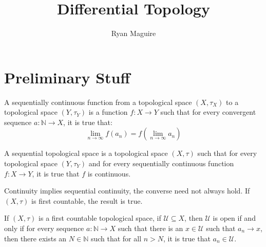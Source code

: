 \documentclass{article}                                                        %
\begin{document}
    \title{Differential Topology}
    \author{Ryan Maguire}
    \date{\vspace{-5ex}}
    \maketitle
    \section{Preliminary Stuff}
        \begin{definition}
            A sequentially continuous function from a topological space
            $(X,\tau_{X})$ to a topological space $(Y,\tau_{Y})$ is a
            function $f:X\rightarrow{Y}$ such that for every convergent sequence
            $a:\mathbb{N}\rightarrow{X}$, it is true that:
            \begin{equation*}
                \lim_{n\rightarrow\infty}f(a_{n})
                =f(\lim_{n\rightarrow\infty}a_{n})
            \end{equation*}
        \end{definition}
        \begin{definition}
            A sequential topological space is a topological space $(X,\tau)$
            such that for every topological space $(Y,\tau_{Y})$ and for every
            sequentially continuous function $f:X\rightarrow{Y}$, it is true
            that $f$ is continuous.
        \end{definition}
        Continuity implies sequential continuity, the converse need not always
        hold. If $(X,\tau)$ is first countable, the result is true.
        \begin{theorem}
            If $(X,\tau)$ is a first countable topological space, if
            $\mathcal{U}\subseteq{X}$, then $\mathcal{U}$ is open if and only if
            for every sequence $a:\mathbb{N}\rightarrow{X}$ such that there is
            an $x\in\mathcal{U}$ such that $a_{n}\rightarrow{x}$, then there
            exists an $N\in\mathbb{N}$ such that for all $n>N$, it is true that
            $a_{n}\in\mathcal{U}$.
        \end{theorem}
\end{document}

